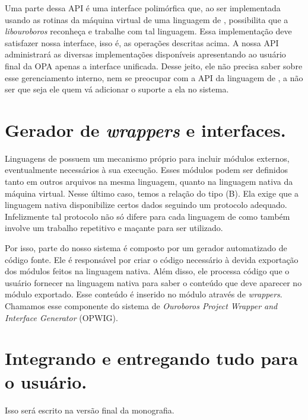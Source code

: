 
    Uma parte dessa API é uma interface polimórfica que, ao ser implementada usando
    as rotinas da máquina virtual de uma linguagem de \script{}, possibilita que
    a \emph{libouroboros} reconheça e trabalhe com tal linguagem. Essa
    implementação deve satisfazer nossa interface, isso é, as operações
    descritas acima. A nossa API administrará as diversas implementações
    disponíveis apresentando ao usuário final da OPA apenas a interface
    unificada. Desse jeito, ele não precisa saber sobre esse gerenciamento
    interno, nem se preocupar com a API da linguagem de \script{}, a não ser que
    seja ele quem vá adicionar o suporte a ela no sistema.
    
  
  
  \section{Gerador de \emph{wrappers} e interfaces.}
  \label{sec:estrutura:opwig}


    Linguagens de \script{} possuem um mecanismo próprio para incluir módulos
    externos, eventualmente necessários à sua execução. Esses módulos podem ser
    definidos tanto em outros arquivos na mesma linguagem, quanto na linguagem
    nativa da máquina virtual. Nesse último caso, temos a relação do tipo (B). Ela
    exige que a linguagem nativa disponibilize certos dados seguindo um protocolo
    adequado. Infelizmente tal protocolo não só difere para cada linguagem de
    \script{} como também involve um trabalho repetitivo e maçante para ser utilizado. 

    
    Por isso, parte do nosso sistema é composto por um gerador automatizado de código fonte.
    Ele é responsável por criar o código necessário à devida exportação dos módulos 
    feitos na linguagem nativa. Além disso, ele processa código que o usuário fornecer na
    linguagem nativa para saber o conteúdo que deve aparecer no módulo exportado.
    Esse conteúdo é inserido no módulo através de \emph{wrappers}. Chamamos esse componente
    do sistema de \emph{Ouroboros Project Wrapper and Interface Generator} (OPWIG).
  
  
  \section{Integrando e entregando tudo para o usuário.}
  \label{sec:estrutura:integration}

    Isso será escrito na versão final da monografia.
